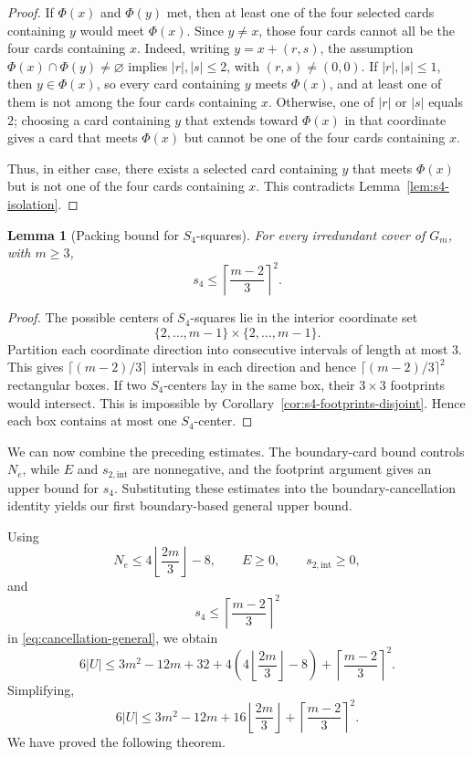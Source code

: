 \documentclass[11pt]{article}
\newtheorem{lemma}[theorem]{Lemma}
\begin{document}
	\begin{proof}
		If \(\Phi(x)\) and \(\Phi(y)\) met, then at least one of the four selected cards
		containing \(y\) would meet \(\Phi(x)\). Since \(y\neq x\), those four cards
		cannot all be the four cards containing \(x\). Indeed, writing \(y=x+(r,s)\), the assumption \(\Phi(x)\cap\Phi(y)\neq\varnothing\) implies \(|r|,|s|\le2\), with \((r,s)\neq(0,0)\). If \(|r|,|s|\le1\), then \(y\in\Phi(x)\), so every card containing \(y\) meets \(\Phi(x)\), and at least one of them is not among the four cards containing \(x\). Otherwise, one of \(|r|\) or \(|s|\) equals \(2\); choosing a card containing \(y\) that extends toward \(\Phi(x)\) in that coordinate gives a card that meets \(\Phi(x)\) but cannot be one of the four cards containing \(x\).
		
		Thus, in either case, there exists a selected card containing \(y\) that meets \(\Phi(x)\) but is not one of the four cards containing \(x\). This contradicts Lemma~\ref{lem:s4-isolation}.
	\end{proof}
	
	
	\begin{lemma}[Packing bound for \(S_4\)-squares]
		For every irredundant cover of \(G_m\), with \(m\ge3\),
		\[
		s_4\le \left\lceil\frac{m-2}{3}\right\rceil^2.
		\]
	\end{lemma}
	
	\begin{proof}
		The possible centers of \(S_4\)-squares lie in the interior coordinate set
		\[
		\{2,\ldots,m-1\}\times\{2,\ldots,m-1\}.
		\]
		Partition each coordinate direction into consecutive intervals of length at
		most \(3\).  This gives \(\lceil(m-2)/3\rceil\) intervals in each direction and
		hence \(\lceil(m-2)/3\rceil^2\) rectangular boxes.  If two \(S_4\)-centers lay
		in the same box, their \(3\times3\) footprints would intersect.  This is
		impossible by Corollary~\ref{cor:s4-footprints-disjoint}.  Hence each box
		contains at most one \(S_4\)-center.
	\end{proof}
	
	We can now combine the preceding estimates. The boundary-card bound controls \(N_e\), while \(E\) and \(s_{2,\mathrm{int}}\) are nonnegative, and the footprint argument gives an upper bound for \(s_4\). Substituting these estimates into the boundary-cancellation identity yields our first boundary-based general upper bound.
	
	Using
	\[
	N_e\le4\left\lfloor\frac{2m}{3}\right\rfloor-8,
	\qquad
	E\ge0,
	\qquad
	s_{2,\mathrm{int}}\ge0,
	\]
	and
	\[
	s_4\le\left\lceil\frac{m-2}{3}\right\rceil^2
	\]
	in \eqref{eq:cancellation-general}, we obtain
	\[
	6|U|
	\le
	3m^2-12m+32
	+
	4\left(4\left\lfloor\frac{2m}{3}\right\rfloor-8\right)
	+
	\left\lceil\frac{m-2}{3}\right\rceil^2.
	\]
	Simplifying,
	\[
	6|U|
	\le
	3m^2-12m
	+
	16\left\lfloor\frac{2m}{3}\right\rfloor
	+
	\left\lceil\frac{m-2}{3}\right\rceil^2.
	\]
	We have proved the following theorem.
	
\end{document}
